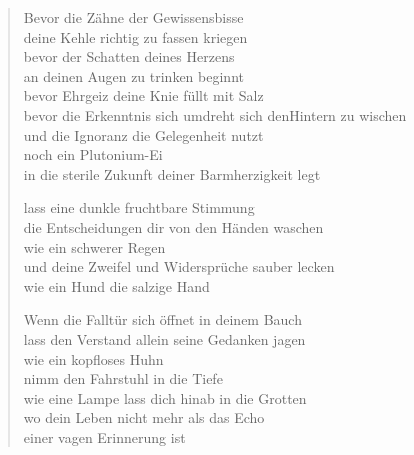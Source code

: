 
\cleartoverso


\begin{verse}

Bevor die Zähne der Gewissensbisse\\
deine Kehle richtig zu fassen kriegen\\
bevor der Schatten deines Herzens\\
an deinen Augen zu trinken beginnt\\
bevor Ehrgeiz deine Knie füllt mit Salz\\
bevor die Erkenntnis sich umdreht sich den\verselinebreak Hintern zu wischen\\
und die Ignoranz die Gelegenheit nutzt\\
noch ein Plutonium-Ei\\
in die sterile Zukunft deiner Barmherzigkeit legt

lass eine dunkle fruchtbare Stimmung\\
die Entscheidungen dir von den Händen waschen\\
wie ein schwerer Regen\\
und deine Zweifel und Widersprüche sauber lecken\\
wie ein Hund die salzige Hand

Wenn die Falltür sich öffnet in deinem Bauch\\
lass den Verstand allein seine Gedanken jagen\\
wie ein kopfloses Huhn\\
nimm den Fahrstuhl in die Tiefe\\
wie eine Lampe lass dich hinab in die Grotten\\
wo dein Leben nicht mehr als das Echo\\
einer vagen Erinnerung ist
\end{verse}

\clearpage


